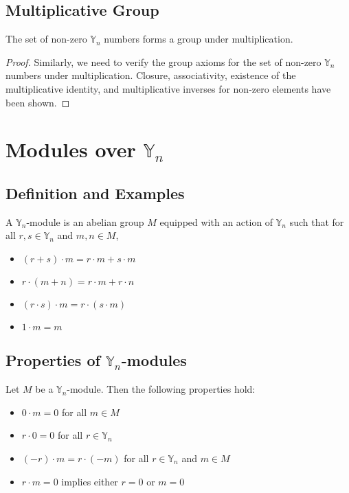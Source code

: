 \documentclass[12pt]{book}
\begin{document}
\subsection{Multiplicative Group}
\begin{theorem}
The set of non-zero $\mathbb{Y}_n$ numbers forms a group under multiplication.
\end{theorem}
\begin{proof}
Similarly, we need to verify the group axioms for the set of non-zero $\mathbb{Y}_n$ numbers under multiplication. Closure, associativity, existence of the multiplicative identity, and multiplicative inverses for non-zero elements have been shown. 
\end{proof}

\section{Modules over $\mathbb{Y}_n$}
\subsection{Definition and Examples}
\begin{definition}
A $\mathbb{Y}_n$-module is an abelian group $M$ equipped with an action of $\mathbb{Y}_n$ such that for all $r, s \in \mathbb{Y}_n$ and $m, n \in M$,
\begin{itemize}
    \item $(r + s) \cdot m = r \cdot m + s \cdot m$
    \item $r \cdot (m + n) = r \cdot m + r \cdot n$
    \item $(r \cdot s) \cdot m = r \cdot (s \cdot m)$
    \item $1 \cdot m = m$
\end{itemize}
\end{definition}

\subsection{Properties of $\mathbb{Y}_n$-modules}
\begin{theorem}
Let $M$ be a $\mathbb{Y}_n$-module. Then the following properties hold:
\begin{itemize}
    \item $0 \cdot m = 0$ for all $m \in M$
    \item $r \cdot 0 = 0$ for all $r \in \mathbb{Y}_n$
    \item $(-r) \cdot m = r \cdot (-m)$ for all $r \in \mathbb{Y}_n$ and $m \in M$
    \item $r \cdot m = 0$ implies either $r = 0$ or $m = 0$
\end{itemize}
\end{theorem}
\end{document}
